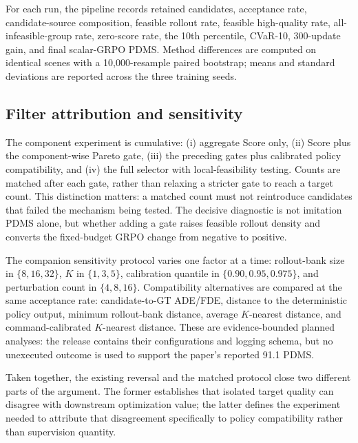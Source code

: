 For each run, the pipeline records retained candidates, acceptance rate,
candidate-source composition, feasible rollout rate, feasible high-quality
rate, all-infeasible-group rate, zero-score rate, the 10th percentile,
CVaR-10, 300-update gain, and final scalar-GRPO PDMS.  Method differences are
computed on identical scenes with a 10,000-resample paired bootstrap; means
and standard deviations are reported across the three training seeds.

\subsection{Filter attribution and sensitivity}
\label{sec:pcmts-components}

The component experiment is cumulative: (i) aggregate Score only, (ii) Score
plus the component-wise Pareto gate, (iii) the preceding gates plus calibrated
policy compatibility, and (iv) the full selector with local-feasibility
testing.  Counts are matched after each gate, rather than relaxing a stricter
gate to reach a target count.  This distinction matters: a matched count must
not reintroduce candidates that failed the mechanism being tested.  The
decisive diagnostic is not imitation PDMS alone, but whether adding a gate
raises feasible rollout density and converts the fixed-budget GRPO change from
negative to positive.

The companion sensitivity protocol varies one factor at a time: rollout-bank
size in $\{8,16,32\}$, $K$ in $\{1,3,5\}$, calibration quantile in
$\{0.90,0.95,0.975\}$, and perturbation count in $\{4,8,16\}$.  Compatibility
alternatives are compared at the same acceptance rate: candidate-to-GT
ADE/FDE, distance to the deterministic policy output, minimum rollout-bank
distance, average $K$-nearest distance, and command-calibrated $K$-nearest
distance.  These are evidence-bounded planned analyses: the release contains
their configurations and logging schema, but no unexecuted outcome is used to
support the paper's reported 91.1 PDMS.

Taken together, the existing reversal and the matched protocol close two
different parts of the argument.  The former establishes that isolated target
quality can disagree with downstream optimization value; the latter defines
the experiment needed to attribute that disagreement specifically to policy
compatibility rather than supervision quantity.
